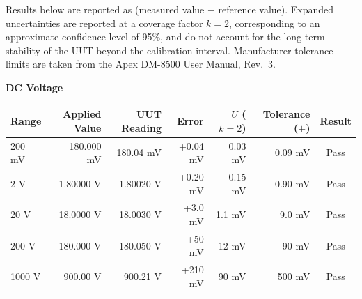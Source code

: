 
Results below are reported as (measured value $-$ reference value). Expanded uncertainties
are reported at a coverage factor $k=2$, corresponding to an approximate confidence level
of 95\%, and do not account for the long-term stability of the UUT beyond the calibration
interval. Manufacturer tolerance limits are taken from the Apex DM-8500 User Manual, Rev.\ 3.

\vspace{4pt}
{\small\sffamily\bfseries\color{certnavy} DC Voltage}
\vspace{2pt}
\begin{center}
\small
\begin{tabular}{@{}lrrrrrc@{}}
  \toprule
  Range & Applied Value & UUT Reading & Error & $U$ ($k=2$) & Tolerance ($\pm$) & Result \\
  \midrule
  200 mV & 180.000 mV & 180.04 mV & +0.04 mV & 0.03 mV & 0.09 mV & \textcolor{certpass}{Pass} \\
  2 V    & 1.80000 V  & 1.80020 V & +0.20 mV & 0.15 mV & 0.90 mV & \textcolor{certpass}{Pass} \\
  20 V   & 18.0000 V  & 18.0030 V & +3.0 mV  & 1.1 mV  & 9.0 mV  & \textcolor{certpass}{Pass} \\
  200 V  & 180.000 V  & 180.050 V & +50 mV   & 12 mV   & 90 mV   & \textcolor{certpass}{Pass} \\
  1000 V & 900.00 V   & 900.21 V  & +210 mV  & 90 mV   & 500 mV  & \textcolor{certpass}{Pass} \\
  \bottomrule
\end{tabular}
\end{center}

